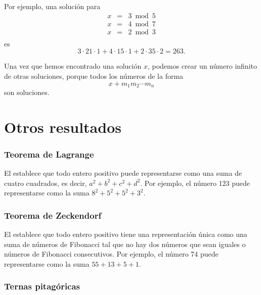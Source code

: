 Por ejemplo, una solución para
\[
\begin{array}{lcl}
x & = & 3 \bmod 5 \\
x & = & 4 \bmod 7 \\
x & = & 2 \bmod 3 \\
\end{array}
\]
es
\[ 3 \cdot 21 \cdot 1 + 4 \cdot 15 \cdot 1 + 2 \cdot 35 \cdot 2 = 263.\]

Una vez que hemos encontrado una solución $x$,
podemos crear un número infinito de otras soluciones,
porque todos los números de la forma
\[x+m_1 m_2 \cdots m_n\]
son soluciones.

\section{Otros resultados}

\subsubsection{Teorema de Lagrange}


El 
establece que todo entero positivo
puede representarse como una suma de cuatro cuadrados, es decir,
$a^2+b^2+c^2+d^2$.
Por ejemplo, el número 123 puede representarse
como la suma $8^2+5^2+5^2+3^2$.

\subsubsection{Teorema de Zeckendorf}


El 
establece que todo
entero positivo tiene una representación única
como una suma de números de Fibonacci tal que
no hay dos números que sean iguales o números
de Fibonacci consecutivos.
Por ejemplo, el número 74 puede representarse
como la suma $55+13+5+1$.

\subsubsection{Ternas pitagóricas}


